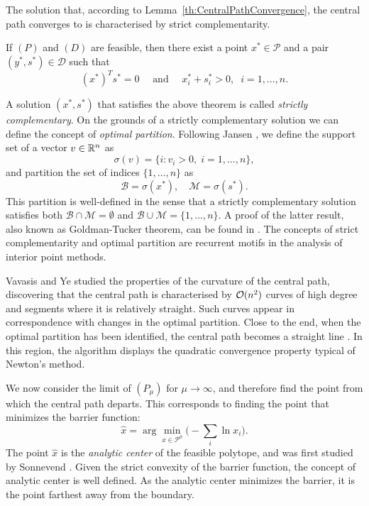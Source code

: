 The solution that, according to Lemma~\ref{th:CentralPathConvergence},
the central path converges to is
characterised by strict complementarity.

\begin{theorem}
If $(P)$ and $(D)$ are feasible, then there exist a point $x^* \in\mathcal{P}$
and a pair $(y^*,s^*) \in \mathcal{D}$ such that
\[
(x^*)^T s^* = 0 \quad\mbox{ and }\quad x^*_i + s_i^* >0, \;\; i = 1, \ldots, n.
\]
\end{theorem}

A solution $(x^*,s^*)$ that satisfies the above theorem is called 
{\em strictly complementary}. 
On the grounds of a strictly complementary
solution we can define the concept of {\em optimal partition}.
Following Jansen \cite{phd:Jansen}, we define the support set
of a vector $v \in \mathbb{R}^n$ as
\[
   \sigma(v) = \{ i : v_i > 0, \; i=1,\ldots,n \},
\]
and partition the set of indices $\{1,\ldots,n \}$ as
\[
   \mathcal{B} = \sigma(x^*), \quad \mathcal{M} = \sigma(s^*).
\]
This partition is well-defined in the sense that a 
strictly complementary solution satisfies both 
$\mathcal{B} \cap \mathcal{M} = \emptyset$ and 
$\mathcal{B} \cup \mathcal{M} = \{1,\ldots,n \}$. 
A proof of the latter result, also known as Goldman-Tucker theorem, 
can be found in \cite{ipm:Wright97}.
The concepts of strict complementarity and optimal partition are
recurrent motifs in the analysis of interior point methods.

Vavasis and Ye \cite{VavasisYe} studied the properties of the 
curvature of the central path, discovering that the central path
is characterised by $\mathcal{O}(n^2)$ curves of high degree and
segments where it is relatively straight.
Such curves appear in correspondence with changes in the optimal
partition.
Close to the end, when the optimal partition has been identified,
the central path becomes a straight line \cite{Megiddo}.
In this region, the algorithm displays the quadratic convergence 
property typical of Newton's method.

We now consider
the limit of $(P_\mu)$ for $\mu \to \infty$, and therefore
find the point from which the central path departs.
This corresponds to finding the point that minimizes the barrier function:
\[
\hat{x} = \arg \min_{x \in \mathcal{P}^0} \big(-\sum_i \ln x_i \big).
\]
The point $\hat{x}$ is the {\em analytic center} of the feasible polytope, 
and was first studied by Sonnevend \cite{Sonnevend86}.
Given the strict convexity of the barrier function, the concept 
of analytic center is well defined.
As the analytic center minimizes the barrier, it
is the point farthest away from the boundary.

